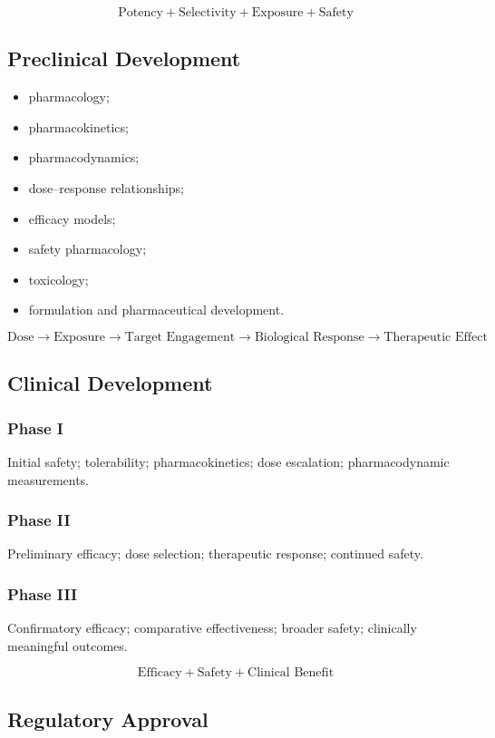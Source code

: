 \documentclass[11pt]{article}
\begin{document}
\[
\boxed{\text{Potency} + \text{Selectivity} + \text{Exposure} + \text{Safety}}
\]

\subsection{Preclinical Development}

\begin{itemize}[nosep]
\item pharmacology;
\item pharmacokinetics;
\item pharmacodynamics;
\item dose--response relationships;
\item efficacy models;
\item safety pharmacology;
\item toxicology;
\item formulation and pharmaceutical development.
\end{itemize}

\[
\boxed{
\text{Dose} \rightarrow \text{Exposure} \rightarrow
\text{Target Engagement} \rightarrow \text{Biological Response}
\rightarrow \text{Therapeutic Effect}
}
\]

\subsection{Clinical Development}

\subsubsection{Phase I}
Initial safety; tolerability; pharmacokinetics; dose escalation;
pharmacodynamic measurements.

\subsubsection{Phase II}
Preliminary efficacy; dose selection; therapeutic response;
continued safety.

\subsubsection{Phase III}
Confirmatory efficacy; comparative effectiveness; broader safety;
clinically meaningful outcomes.

\[
\boxed{\text{Efficacy} + \text{Safety} + \text{Clinical Benefit}}
\]

\subsection{Regulatory Approval}
\end{document}
